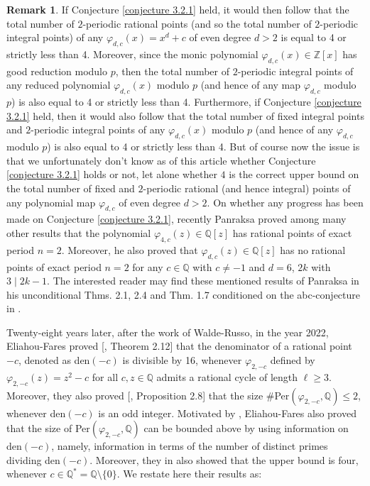 \documentclass{article}
\theoremstyle{plain}
\theoremstyle{definition}
\newtheorem{rem}[thm]{Remark}
\begin{document}
\begin{rem} \label{nt}
If Conjecture \ref{conjecture 3.2.1} held, it would then follow that the total number of $2$-periodic rational points (and so the total number of $2$-periodic integral points) of any $\varphi_{d,c}(x) = x^d + c$ of even degree $d>2$ is equal to 4 or strictly less than 4. Moreover, since the monic polynomial $\varphi_{d,c}(x)\in \mathbb{Z}[x]$ has good reduction modulo $p$, then the total number of $2$-periodic integral points of any reduced polynomial $\varphi_{d,c}(x)$ modulo $p$ (and hence of any map $\varphi_{d,c}$ modulo $p$) is also equal to 4 or strictly less than 4. Furthermore, if Conjecture \ref{conjecture 3.2.1} held, then it would also follow that the total number of fixed integral points and $2$-periodic integral points of any $\varphi_{d,c}(x)$ modulo $p$ (and hence of any $\varphi_{d,c}$ modulo $p$) is also equal to 4 or strictly less than 4. But of course now the issue is that we unfortunately don't know as of this article whether Conjecture \ref{conjecture 3.2.1} holds or not, let alone whether $4$ is the correct upper bound on the total number of fixed and $2$-periodic rational (and hence integral) points of any polynomial map $\varphi_{d,c}$ of even degree $d>2$. On whether any progress has been made on Conjecture \ref{conjecture 3.2.1}, recently Panraksa \cite{par2} proved among many other results that the polynomial $\varphi_{4,c}(z)\in\mathbb{Q}[z]$ has rational points of exact period $n = 2$. Moreover, he also proved that $\varphi_{d,c}(z)\in\mathbb{Q}[z]$ has no rational points of exact period $n = 2$ for any $c \in \mathbb{Q}$ with $c \neq -1$ and $d = 6$, $2k$ with $3 \mid 2k-1$. The interested reader may find these mentioned results of Panraksa in his unconditional Thms. 2.1, 2.4 and Thm. 1.7 conditioned on the abc-conjecture in \cite{par2}.
\end{rem}


Twenty-eight years later, after the work of Walde-Russo, in the year 2022, Eliahou-Fares proved [\cite{Shalom2}, Theorem 2.12] that the denominator of a rational point $-c$, denoted as den$(-c)$ is divisible by 16, whenever $\varphi_{2,-c}$ defined by $\varphi_{2, -c}(z) = z^2 - c$ for all $c, z\in \mathbb{Q}$ admits a rational cycle of length $\ell \geq 3$. Moreover, they also proved [\cite{Shalom2}, Proposition 2.8] that the size \#Per$(\varphi_{2, -c}, \mathbb{Q})\leq 2$, whenever den$(-c)$ is an odd integer. Motivated by \cite{Call}, Eliahou-Fares \cite{Shalom2} also proved that the size of Per$(\varphi_{2, -c}, \mathbb{Q})$ can be bounded above by using information on den$(-c)$, namely, information in terms of the number of distinct primes dividing den$(-c)$. Moreover, they in \cite{Shalom1} also showed that the upper bound is four, whenever $c\in \mathbb{Q^*} = \mathbb{Q}\setminus\{0\}$. We restate here their results as:
\end{document}
